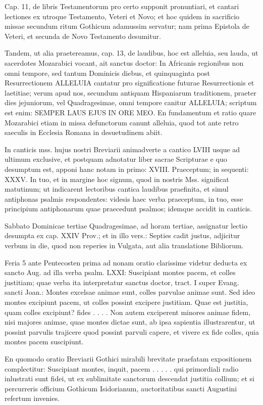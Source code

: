 \documentclass[letter,11pt]{book}
\begin{document}
Cap. 11, de libris Testamentorum pro certo supponit pronuntiari, et cantari lectiones ex utroque Testamento, Veteri et Novo; et hoc quidem in sacrificio missae secundum ritum Gothicum adamussim servatur; nam prima Epistola de Veteri, et secunda de Novo Testamento desumitur.

Tandem, ut alia praetereamus, cap. 13, de laudibus, hoc est alleluia, seu lauda, ut sacerdotes Mozarabici vocant, ait sanctus doctor: In Africanis regionibus non omni tempore, sed tantum Dominicis diebus, et quinquaginta post Resurrectionem ALLELUIA cantatur pro significatione futurae Resurrectionis et laetitiae; verum apud nos, secundum antiquam Hispaniarum traditionem, praeter dies jejuniorum, vel Quadragesimae, omni tempore canitur ALLELUIA; scriptum est enim: SEMPER LAUS EJUS IN ORE MEO. En fundamentum et ratio quare Mozarabici etiam in missa defunctorum canunt alleluia, quod tot ante retro saeculis in Ecclesia Romana in desuetudinem abiit.

In canticis mss. hujus nostri Breviarii animadverte a cantico LVIII usque ad ultimum exclusive, et postquam adnotatur liber sacrae Scripturae e quo desumptum est, apponi hanc notam in primo: XVIII. Praeceptum; in sequenti: XXXV. In tuo, et in margine hoc signum, quod in nostris Mss. significat matutinum; ut indicarent lectoribus cantica laudibus praefinita, et simul antiphonas psalmis respondentes: videsis haec verba praeceptum, in tuo, esse principium antiphonarum quae praecedunt psalmos; idemque accidit in canticis.

Sabbato Dominicae tertiae Quadragesimae, ad horam tertiae, assignatur lectio desumpta ex cap. XXIV Prov.; et in illo vers.: Septies cadit justus, adjicitur verbum in die, quod non reperies in Vulgata, aut alia translatione Bibliorum.

Feria 5 ante Pentecosten prima ad nonam oratio clarissime videtur deducta ex sancto Aug. ad illa verba psalm. LXXI: Suscipiant montes pacem, et colles justitiam; quae verba ita interpretatur sanctus doctor, tract. I super Evang. sancti Joan.: Montes excelsae animae sunt, colles parvulae animae sunt. Sed ideo montes excipiunt pacem, ut colles possint excipere justitiam. Quae est justitia, quam colles excipiunt? fides . . . . Non autem exciperent minores animae fidem, nisi majores animae, quae montes dictae sunt, ab ipsa sapientia illustrarentur, ut possint parvulis trajicere quod possint parvuli capere, et vivere ex fide colles, quia montes pacem suscipiunt.

En quomodo oratio Breviarii Gothici mirabili brevitate praefatam expositionem complectitur: Suscipiant montes, inquit, pacem . . . . . qui primordiali radio inlustrati sunt fidei, ut ex sublimitate sanctorum descendat justitia collium; et si percurreris officium Gothicum Isidorianum, auctoritatibus sancti Augustini refertum invenies.
\end{document}

